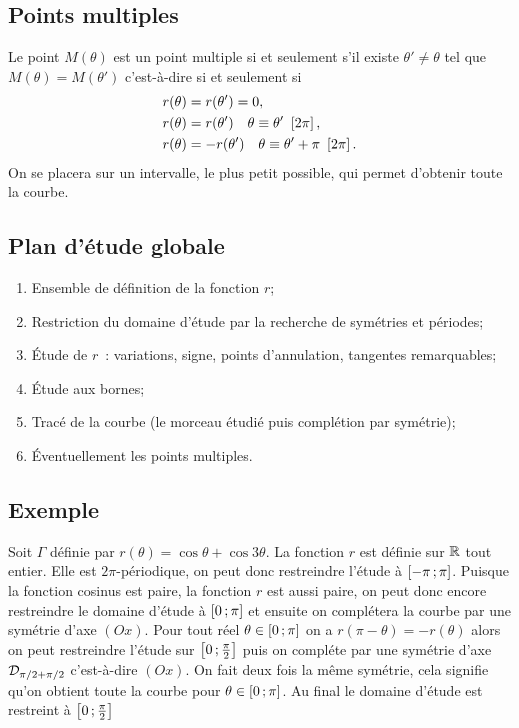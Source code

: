 \subsection{Points multiples}
Le point $M(\theta)$ est un point multiple si et seulement s'il existe $\theta' \neq \theta$ tel que $M(\theta)=M(\theta')$ c'est-à-dire si et seulement si
\begin{align}
 r(\theta)&=r(\theta')=0, \\
 r(\theta)&=r(\theta') \quad \theta \equiv \theta'~\left[2\pi \right],\\
 r(\theta)&=-r(\theta') \quad \theta \equiv \theta'+\pi~\left[2\pi \right].
\end{align}
On se placera sur un intervalle, le plus petit possible, qui permet d'obtenir toute la courbe.
\subsection{Plan d'étude globale}
\begin{enumerate}
\item Ensemble de définition de la fonction $r$;
\item Restriction du domaine d'étude par la recherche de symétries et périodes;
\item Étude de $r$~: variations, signe, points d'annulation, tangentes remarquables;
\item Étude aux bornes;
\item Tracé de la courbe (le morceau étudié puis complétion par symétrie);
\item Éventuellement les points multiples. 
\end{enumerate}

\subsection{Exemple}

Soit $\Gamma$ définie par $r(\theta)=\cos \theta + \cos 3\theta$. La fonction $r$ est définie sur $\mathbb{R}$ tout entier. Elle est $2\pi$-périodique, on peut donc restreindre l'étude à $\left[ -\pi \, ;  \pi \right]$. Puisque la fonction cosinus est paire, la fonction $r$ est aussi paire, on peut donc encore restreindre le domaine d'étude à $\left[ 0 \, ;  \pi \right]$ et ensuite on complétera la courbe par une symétrie d'axe $(Ox)$. Pour tout réel $\theta \in \left[ 0 \, ;  \pi \right]$ on a $r(\pi-\theta)=-r(\theta)$ alors on peut restreindre l'étude sur $\left[ 0 \, ;  \frac{\pi}{2} \right]$ puis on compléte par une symétrie d'axe $\mathcal{D}_{\pi/2+\pi/2}$ c'est-à-dire $(Ox)$. On fait deux fois la même symétrie, cela signifie qu'on obtient toute la courbe pour $\theta \in \left[ 0 \, ;  \pi \right]$. Au final le domaine d'étude est restreint à $\left[ 0 \, ;  \frac{\pi}{2} \right]$

